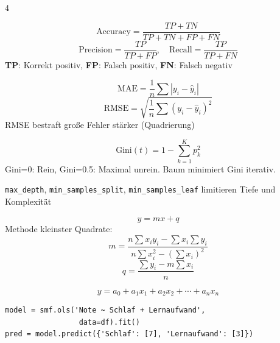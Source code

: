 \begin{landscape}
\begin{multicols*}{4}
		\begin{cheatSheetBox}[title=Klassifikation-Metriken]
			\[
				\text{Accuracy} = \frac{TP + TN}{TP+TN+FP+FN}
			\]
			\[
				\text{Precision} = \frac{TP}{TP+FP}, \quad
				\text{Recall} = \frac{TP}{TP+FN}
			\]
			\textbf{TP}: Korrekt positiv, \textbf{FP}: Falsch positiv, \textbf{FN}: Falsch negativ
		\end{cheatSheetBox}

		\begin{cheatSheetBox}[title=Regression-Metriken]
			\[
				\text{MAE} = \frac{1}{n}\sum|y_i - \hat{y}_i|
			\]
			\[
				\text{RMSE} = \sqrt{\frac{1}{n}\sum(y_i - \hat{y}_i)^2}
			\]
			RMSE bestraft große Fehler stärker (Quadrierung)
		\end{cheatSheetBox}


		\begin{cheatSheetBox}[title=Gini-Reinheitsmass]
			\[
				\text{Gini}(t) = 1 - \sum_{k=1}^{K} p_k^2
			\]
			Gini=0: Rein, Gini=0.5: Maximal unrein. Baum minimiert Gini iterativ.
		\end{cheatSheetBox}

		\begin{cheatSheetBox}[title=Overfitting-Prävention]
			\texttt{max\_depth}, \texttt{min\_samples\_split}, \texttt{min\_samples\_leaf} limitieren Tiefe und Komplexität
		\end{cheatSheetBox}


		\begin{cheatSheetBox}[title=Einfache lineare Regression]
			\[y = mx + q\]
			Methode kleinster Quadrate:
			\[
				m = \frac{n\sum x_i y_i - \sum x_i \sum y_i}{n\sum x_i^2 - (\sum x_i)^2}
			\]
			\[
				q = \frac{\sum y_i - m\sum x_i}{n}
			\]
		\end{cheatSheetBox}

		\begin{cheatSheetBox}[title=Multiple lineare Regression]
			\[
				y = a_0 + a_1 x_1 + a_2 x_2 + \cdots + a_n x_n
			\]
			\begin{lstlisting}
model = smf.ols('Note ~ Schlaf + Lernaufwand', 
                 data=df).fit()
pred = model.predict({'Schlaf': [7], 'Lernaufwand': [3]})
			\end{lstlisting}
		\end{cheatSheetBox}


\end{multicols*}
\end{landscape}
